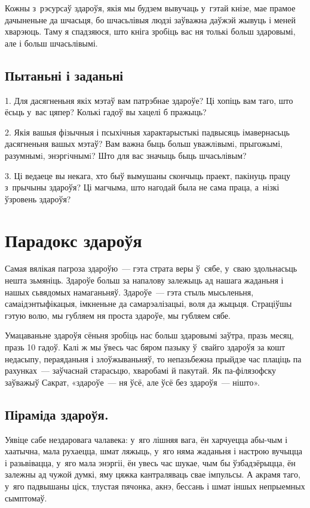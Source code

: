 Кожны з~рэсурсаў здароўя, якія мы будзем вывучаць у~гэтай кнізе, мае прамое дачыненьне да шчасьця, бо шчасьлівыя людзі заўважна даўжэй жывуць і меней хварэюць. Таму я спадзяюся, што кніга зробіць вас ня толькі больш здаровымі, але і больш шчасьлівымі.


\subsection*{Пытаньні і заданьні}

1. Для дасягненьня якіх мэтаў вам патрэбнае здароўе? Ці хопіць вам таго, што ёсьць у~вас цяпер? Колькі гадоў вы хацелі б пражыць?

2. Якія вашыя фізычныя і псыхічныя характарыстыкі падвысяць імавернасьць дасягненьня вашых мэтаў? Вам важна быць больш уважлiвымi, прыгожымі, разумнымi, энэргiчнымi? Што для вас значыць быць шчасьлівым?

3. Ці ведаеце вы некага, хто быў вымушаны скончыць праект, пакінуць працу з~прычыны здароўя? Ці магчыма, што нагодай была не сама праца, а~нізкі ўзровень здароўя?


\section{Парадокс здароўя}

Самая вялікая пагроза здароўю~--- гэта страта веры ў~сябе, у~сваю здольнасьць нешта зьмяніць. Здароўе больш за напалову залежыць ад нашага жаданьня і нашых сьвядомых намаганьняў. Здароўе~--- гэта стыль мысьленьня, самаідэнтыфікацыя, імкненьне да самарэалізацыі, воля да жыцьця. Страціўшы гэтую волю, мы губляем ня проста здароўе, мы губляем сябе. 


Умацаваньне здароўя сёньня зробіць нас больш здаровымі заўтра, празь месяц, празь 10 гадоў. Калі ж мы ўвесь час бяром пазыку ў~свайго здароўя за кошт недасыпу, пераяданьня і злоўжываньняў, то непазьбежна прыйдзе час плаціць па рахунках~--- заўчаснай старасьцю, хваробамі й пакутай. Як па-філязофску заўважыў Сакрат, «здароўе~--- ня ўсё, але ўсё без здароўя~--- нішто».

\subsection*{Піраміда здароўя.}

Уявіце сабе нездаровага чалавека: у~яго лішняя вага, ён харчуецца абы-чым і хаатычна, мала рухаецца, шмат ляжыць, у~яго няма жаданьня і настрою вучыцца і разьвівацца, у~яго мала энэргіі, ён увесь час шукае, чым бы ўзбадзёрыцца, ён залежны ад чужой думкі, яму цяжка кантраляваць свае імпульсы. А акрамя таго, у~яго падвышаны ціск, тлустая пячонка, акнэ, бессань і шмат іншых непрыемных сымптомаў.

